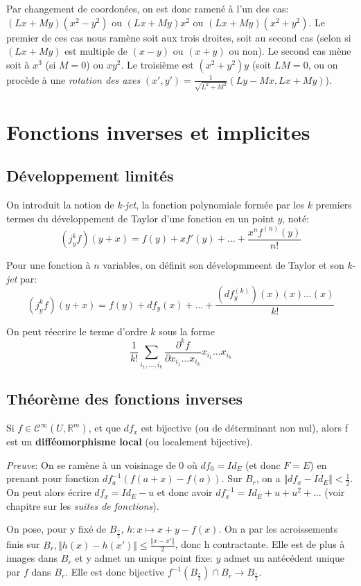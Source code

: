 \documentclass{article}
\begin{document}
Par changement de coordonées, on est donc ramené à l'un des cas: $(Lx+My)(x^2-y^2)$ ou $(Lx+My)x^2$ ou $(Lx+My)(x^2+y^2)$. Le premier de ces cas nous ramène soit aux trois droites, soit au second cas (selon si $(Lx+My)$ est multiple de $(x-y)$ ou $(x+y)$ ou non). Le second cas mène soit à $x^3$ (si $M=0$) ou $xy^2$. Le troisième est $(x^2+y^2)y$ (soit $LM=0$, ou on procède à une \textit{rotation des axes} $(x',y')=\frac{1}{\sqrt{L^2+M^2}}(Ly-Mx,Lx+My)$).

\section{Fonctions inverses et implicites}

\subsection{Développement limités}

On introduit la notion de \textit{k-jet}, la fonction polynomiale formée par les $k$ premiers termes du développement de Taylor d'une fonction en un point $y$, noté: $$(j^k_y f)(y+x) = f(y) + xf'(y)+...+\frac{x^n f^{(n)}(y)}{n!}$$

Pour une fonction à $n$ variables, on définit son dévelopmmeent de Taylor et son \textit{k-jet} par: $$(j^k_y f)(y+x) = f(y) + df_y(x)+...+\frac{(df^{(k)}_y)(x)(x)...(x)}{k!}$$

On peut réecrire le terme d'ordre $k$ sous la forme $$\frac{1}{k!}\sum_{i_1,...,i_k} \frac{\partial^k f}{\partial x_{i_1}...x_{i_k}} x_{i_1}...x_{i_k}$$

\subsection{Théorème des fonctions inverses}

Si $f\in\mathcal{C}^{\infty}(U,\mathbb{R}^m)$, et que $df_x$ est bijective (ou de déterminant non nul), alors f est un \textbf{difféomorphisme local} (ou localement bijective).

\bigskip

\textit{Preuve}: On se ramène à un voisinage de 0 où $df_0=Id_E$ (et donc $F=E$) en prenant pour fonction $df_a^{-1}(f(a+x)-f(a))$. Sur $B_r$, on a $\Vert df_x-Id_E \Vert < \frac{1}{2}$. On peut alors écrire $df_x=Id_E-u$ et donc avoir $df_x^{-1}=Id_E+u+u^2+...$ (voir chapitre sur les \textit{suites de fonctions}).

On pose, pour y fixé de $B_{\frac{r}{2}}$, $h:x\mapsto x+y-f(x)$. On a par les acroissements finis sur $B_r, \Vert h(x) - h(x')\Vert\leq\frac{\Vert x-x' \Vert}{2}$, donc h contractante. Elle est de plus à images dans $B_r$ et y admet un unique point fixe: $y$ admet un antécédent unique par $f$ dans $B_r$. Elle est donc bijective $f^{-1}(B_\frac{r}{2}) \cap B_r \to B_{\frac{r}{2}}$.
\end{document}
